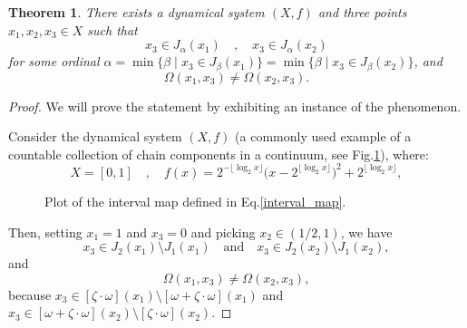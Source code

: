 \documentclass[10pt,a4paper]{article}
\theoremstyle{definition}
\theoremstyle{remark}
\theoremstyle{plain}
\newtheorem{thm}[defi]{Theorem}
\begin{document}
\begin{thm}
    There exists a dynamical system $(X,f)$ and three points $x_1,x_2,x_3\in X$ such that
    $$x_3\in J_\alpha(x_1)\quad,\quad x_3\in J_\alpha(x_2)$$
    for some ordinal $\alpha=\min\{\beta\mid x_3\in J_\beta(x_1)\}=\min\{\beta\mid x_3\in J_\beta(x_2)\}$, and
    $$\Omega(x_1,x_3)\neq\Omega(x_2,x_3).$$
\end{thm}
\begin{proof}
    We will prove the statement by exhibiting an instance of the phenomenon.

    Consider the dynamical system
    $(X,f)$ (a commonly used example of a countable collection of chain components in a continuum, see Fig.\ref{fig_1}), where: 
    \begin{equation*}
        X=[0,1]\quad,\quad f(x)=2^{-\lfloor \log_2 x \rfloor}\bigl(x-2^{\lfloor \log_2 x \rfloor}\bigr)^2+2^{\lfloor \log_2 x \rfloor},
        \label{interval_map}
    \end{equation*}
    \begin{figure}[ht!] 
        \centering
        \caption{Plot of the interval map defined in Eq.\eqref{interval_map}.}
        \label{fig_1}
    \end{figure}
    Then, setting $x_1=1$ and $x_3=0$ and picking $x_2\in(1/2,1)$, we have
    $$x_3\in J_2(x_1)\setminus J_1(x_1)\quad\text{and}\quad x_3\in J_2(x_2)\setminus J_1(x_2),$$
    and
    $$\Omega(x_1,x_3)\neq\Omega(x_2,x_3),$$
    because $x_3\in[\zeta\cdot\omega](x_1)\setminus[\omega+\zeta\cdot\omega](x_1)$ and $x_3\in[\omega+\zeta\cdot\omega](x_2)\setminus[\zeta\cdot\omega](x_2)$.  
\end{proof}
\end{document}
